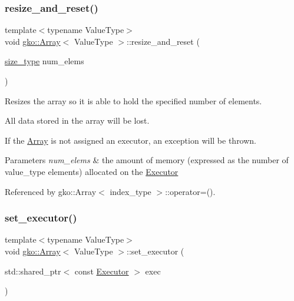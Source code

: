 \subsubsection{\texorpdfstring{resize\+\_\+and\+\_\+reset()}{resize\_and\_reset()}}
{\footnotesize\ttfamily template$<$typename Value\+Type$>$ \\
void \hyperlink{classgko_1_1Array}{gko\+::\+Array}$<$ Value\+Type $>$\+::resize\+\_\+and\+\_\+reset (\begin{DoxyParamCaption}\item[{\hyperlink{namespacegko_a6e5c95df0ae4e47aab2f604a22d98ee7}{size\+\_\+type}}]{num\+\_\+elems }\end{DoxyParamCaption})\hspace{0.3cm}{\ttfamily [inline]}}



Resizes the array so it is able to hold the specified number of elements. 

All data stored in the array will be lost.

If the \hyperlink{classgko_1_1Array}{Array} is not assigned an executor, an exception will be thrown.


\begin{DoxyParams}{Parameters}
{\em num\+\_\+elems} & the amount of memory (expressed as the number of {\ttfamily value\+\_\+type} elements) allocated on the \hyperlink{classgko_1_1Executor}{Executor} \\
\hline
\end{DoxyParams}


Referenced by gko\+::\+Array$<$ index\+\_\+type $>$\+::operator=().

\mbox{\label{classgko_1_1Array_a44dd24e909f518f08320c3065e087d85}} 
\subsubsection{\texorpdfstring{set\+\_\+executor()}{set\_executor()}}
{\footnotesize\ttfamily template$<$typename Value\+Type$>$ \\
void \hyperlink{classgko_1_1Array}{gko\+::\+Array}$<$ Value\+Type $>$\+::set\+\_\+executor (\begin{DoxyParamCaption}\item[{std\+::shared\+\_\+ptr$<$ const \hyperlink{classgko_1_1Executor}{Executor} $>$}]{exec }\end{DoxyParamCaption})\hspace{0.3cm}{\ttfamily [inline]}}



